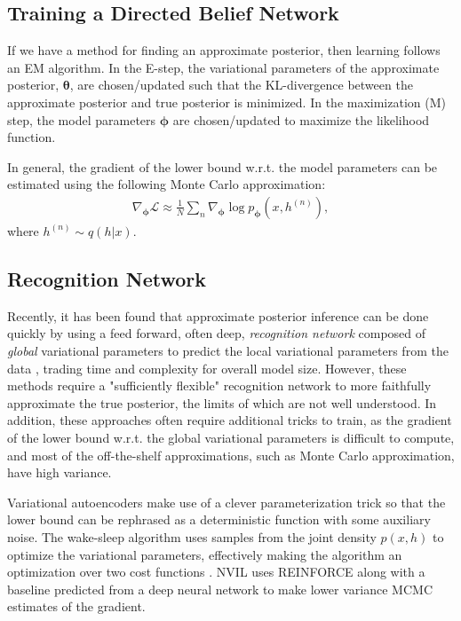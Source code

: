 \documentclass{article} %
\newcommand{\vects}[1]{\boldsymbol{#1}}
\newcommand{\TT}[0]{\vects{\theta}}
\newcommand{\PP}[0]{\vects{\phi}}
\newcommand{\LL}[0]{\mathcal{L}}
\begin{document}
\subsection{Training a Directed Belief Network}

If we have a method for finding an approximate posterior, then learning follows an
EM algorithm.  In the E-step, the variational parameters of the approximate posterior, $\TT$,
are chosen/updated such that the KL-divergence between the approximate posterior and
true posterior is minimized. In the maximization (M) step, the model parameters
$\PP$ are chosen/updated to maximize the likelihood function.

In general, the gradient of the lower bound w.r.t. the model parameters can be
estimated using the following Monte Carlo approximation:
\begin{align} \label{eq:grad}
\nabla_{\PP} \LL \approx \frac{1}{N} \sum_n \nabla_{\PP} \log p_{\PP}(x, h^{(n)}),
\end{align}
where $h^{(n)} \sim q(h|x)$.

\subsection{Recognition Network}

Recently, it has been found that approximate posterior inference can be done
quickly by using a feed forward, often deep, \emph{recognition network} composed
of \emph{global} variational parameters to predict the local variational
parameters from the data \citep[see,
e.g.,][]{kingma2013auto,mnih2014neural,rezende2014stochastic}, trading time and complexity for overall model size. However, these methods require a "sufficiently flexible" recognition network to more faithfully approximate the true posterior, the limits of which are not well understood. In addition, these approaches often require additional tricks to train, as the gradient of the
lower bound w.r.t. the global variational parameters is difficult to compute,
and most of the off-the-shelf approximations, such as Monte Carlo approximation,
have high variance. 

Variational autoencoders \citep[VAE,][]{kingma2013auto} make use of a clever
parameterization trick so that the lower bound can be rephrased as a
deterministic function with some auxiliary noise. The wake-sleep algorithm uses
samples from the joint density $p(x, h)$ to optimize the variational parameters,
effectively making the algorithm an optimization over two cost functions
\citep{hinton1995wake}. NVIL
uses REINFORCE \citep{williams1992simple} along with a baseline predicted from a deep neural network to
make lower variance MCMC estimates of the gradient.
\end{document}
